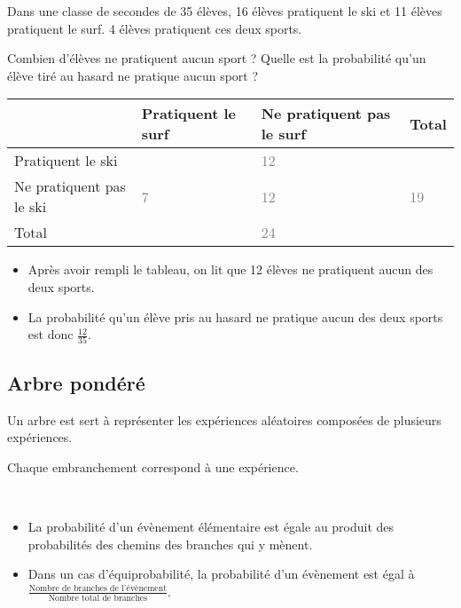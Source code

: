 \begin{exemple}
  Dans une classe de secondes de 35 élèves, 16 élèves pratiquent le ski et 11
  élèves pratiquent le surf. 4 élèves pratiquent ces deux sports.

  Combien d'élèves ne pratiquent aucun sport ? Quelle est la probabilité
  qu'un élève tiré au hasard ne pratique aucun sport ?

  \begin{center}
    \begin{tabular}{>{\centering\arraybackslash}p{7em}||>{\centering\arraybackslash}p{5em}|>{\centering\arraybackslash}p{7em}|>{\centering\arraybackslash}p{5em}}
      & Pratiquent le surf & Ne pratiquent pas le surf & {Total} \\
      \hline
      \hline
      Pratiquent  le ski        & 4                  &    \textcolor{gray}{12}  &  16   \\
      \hline
      Ne pratiquent pas le ski &\textcolor{gray}{7}&\textcolor{gray}{12}       &   \textcolor{gray}{19} \\
      \hline
      Total                    &   11               &\textcolor{gray}{24}       &    35 \\
    \end{tabular}
  \end{center}

  \begin{itemize}
    \item Après avoir rempli le tableau, on lit que 12 élèves ne pratiquent aucun des deux sports.
    \item La probabilité qu'un élève pris au hasard ne pratique aucun des deux sports est donc $\frac{12}{35}$.
  \end{itemize}

\end{exemple}

\subsection{Arbre pondéré}

\begin{desc}
    Un arbre est sert à représenter les expériences aléatoires composées de
    plusieurs expériences.

    Chaque embranchement correspond à une expérience.
\end{desc}

\begin{propriete}~
  \begin{itemize}
    \item La probabilité d'un évènement élémentaire est égale au produit des probabilités des chemins des branches qui y mènent.
    \item Dans un cas d'équiprobabilité, la probabilité d'un évènement est égal à $\frac{\text{Nombre de branches de l'évènement}}{\text{Nombre total de branches}}$.
  \end{itemize}
\end{propriete}

